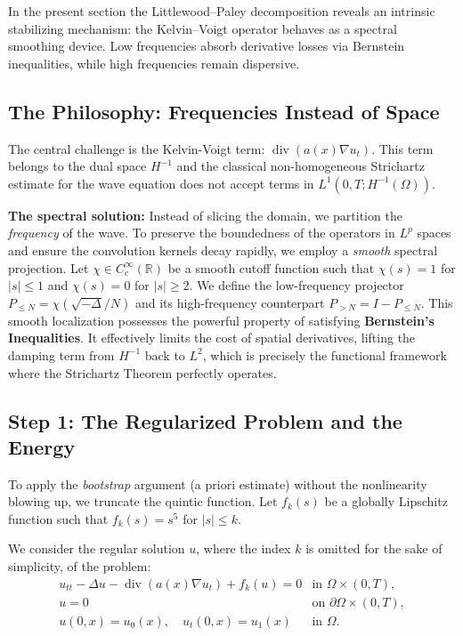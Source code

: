 \documentclass[11pt,letterpaper]{amsart}
\begin{document}
In the present section the Littlewood–Paley decomposition reveals an intrinsic stabilizing mechanism: the Kelvin–Voigt operator behaves as a spectral smoothing device. Low frequencies absorb derivative losses via Bernstein inequalities, while high frequencies remain dispersive.

\subsection{The Philosophy: Frequencies Instead of Space}

The central challenge is the Kelvin-Voigt term: $\operatorname{div}(a(x)\nabla u_t)$.  This term belongs to the dual space $H^{-1}$ and the classical non-homogeneous Strichartz estimate for the wave equation does not accept terms in $L^1(0,T; H^{-1}(\Omega))$.

\textbf{The spectral solution:} Instead of slicing the domain, we partition the \textit{frequency} of the wave. To preserve the boundedness of the operators in $L^p$ spaces and ensure the convolution kernels decay rapidly, we employ a \textit{smooth} spectral projection. Let $\chi \in C_c^\infty(\mathbb{R})$ be a smooth cutoff function such that $\chi(s) = 1$ for $|s| \le 1$ and $\chi(s) = 0$ for $|s| \ge 2$. We define the low-frequency projector $P_{\le N} = \chi(\sqrt{-\Delta}/N)$ and its high-frequency counterpart $P_{>N} = I - P_{\le N}$. This smooth localization possesses the powerful property of satisfying \textbf{Bernstein's Inequalities}. It effectively limits the cost of spatial derivatives, lifting the damping term from $H^{-1}$ back to $L^2$, which is precisely the functional framework where the Strichartz Theorem perfectly operates.

\subsection{Step 1: The Regularized Problem and the Energy}

To apply the \textit{bootstrap} argument (a priori estimate) without the nonlinearity blowing up, we truncate the quintic function. Let $f_k(s)$ be a globally Lipschitz function such that $f_k(s) = s^5$ for $|s| \le k$.

We consider the regular solution $u$, where the index $k$ is omitted for the sake of simplicity, of the problem:
\begin{eqnarray}\label{eq:pde}
u_{tt} - \Delta u - \operatorname{div}(a(x)\nabla u_t) + f_k(u) = 0 & \text{in } \Omega \times (0,T), \\
u = 0 & \text{on } \partial\Omega \times (0,T), \\
u(0,x) = u_0(x), \quad u_t(0,x) = u_1(x) & \text{in } \Omega.
\end{eqnarray}
\end{document}
